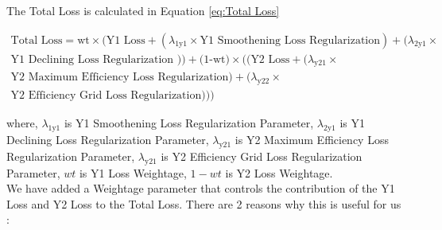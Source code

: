 \documentclass{report} %
\begin{document}
The Total Loss is calculated in Equation \ref{eq:Total Loss}

\vspace{0.2cm} %

\begin{equation}
    \begin{split}
\text{Total Loss} = \text{wt} \times (\text{Y1 Loss} + (\lambda_{\text{1y1}} \times \text{Y1 Smoothening Loss Regularization}) +  (\lambda_{\text{2y1}} \times \\
\text{Y1 Declining Loss Regularization })) + \text{(1-wt)} \times ((\text{Y2 Loss} + (\lambda_{\text{y21}} \times \\ 
\text{Y2 Maximum Efficiency Loss Regularization}) + (\lambda_{\text{y22}} \times \\
\text{Y2 Efficiency Grid Loss Regularization})))
    \end{split}
    \label{eq:Total Loss}
\end{equation}

where, \(\lambda_{\text{1y1}}\) is Y1 Smoothening Loss Regularization Parameter, \(\lambda_{\text{2y1}}\) is Y1 Declining Loss Regularization Parameter,
        \(\lambda_{\text{y21}}\) is Y2 Maximum Efficiency Loss Regularization Parameter, \(\lambda_{\text{y21}}\) is Y2 Efficiency Grid Loss Regularization Parameter, 
        \(wt\) is Y1 Loss Weightage, \(1-wt\) is Y2 Loss Weightage. \\

We have added a Weightage parameter that controls the contribution of the Y1 Loss and Y2 Loss to the Total Loss. There are 2 reasons why this is useful for us :
\end{document}
